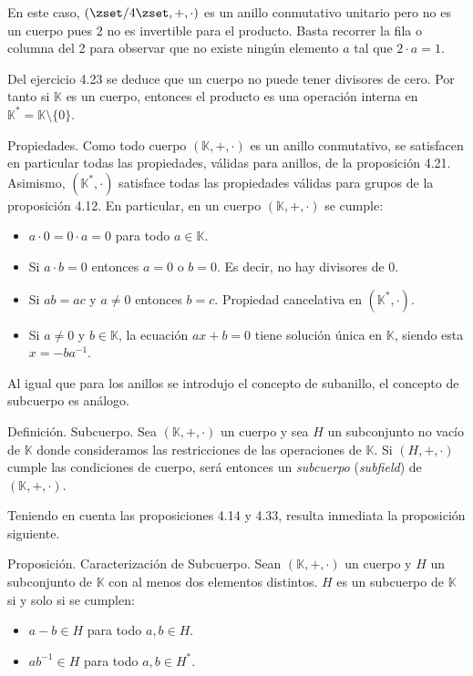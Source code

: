 En este caso, $(\zset/4\zset, +, \cdot)$ es un anillo conmutativo unitario
pero no es un cuerpo  pues 2 no es invertible para el producto. Basta
recorrer la fila o columna del 2 para observar que no existe ningún elemento
$a$ tal que $2 \cdot a = 1$.

Del ejercicio 4.23 se deduce que un cuerpo no puede tener divisores de cero.
Por tanto  si $\mathbb{K}$ es un cuerpo, entonces el producto es una
operación interna en $\mathbb{K}^* = \mathbb{K} \setminus \{0\}$.

Propiedades. Como todo cuerpo $(\mathbb{K}, +, \cdot)$ es un anillo
conmutativo, se satisfacen en particular todas las propiedades, válidas para
anillos, de la proposición 4.21. Asimismo, $(\mathbb{K}^*, \cdot)$ satisface
todas las propiedades válidas para grupos de la proposición 4.12. En
particular, en un cuerpo $(\mathbb{K}, +, \cdot)$ se cumple:

\begin{itemize}
  \item $a \cdot 0 = 0 \cdot a = 0$ para todo $a \in \mathbb{K}$.
  \item Si $a \cdot b = 0$ entonces $a = 0$ o $b = 0$. Es decir, no hay
    divisores de $0$.
  \item Si $ab = ac$ y $a \neq 0$ entonces $b = c$. Propiedad cancelativa en
    $(\mathbb{K}^*, \cdot)$.
  \item Si $a \neq 0$ y $b \in \mathbb{K}$, la ecuación $ax + b = 0$ tiene
    solución única en $\mathbb{K}$, siendo esta $x = -ba^{-1}$.
\end{itemize}

Al igual que para los anillos se introdujo el concepto de subanillo, el
concepto de subcuerpo es análogo.

Definición. Subcuerpo. Sea $(\mathbb{K}, +, \cdot)$ un cuerpo y sea $H$ un
subconjunto no vacío de $\mathbb{K}$ donde consideramos las restricciones de
las operaciones de $\mathbb{K}$. Si $(H, +, \cdot)$ cumple las condiciones
de cuerpo, será entonces un \emph{subcuerpo} (\emph{subfield}) de
$(\mathbb{K}, +, \cdot)$.

Teniendo en cuenta las proposiciones 4.14 y 4.33, resulta inmediata la
proposición siguiente.

Proposición. Caracterización de Subcuerpo. Sean $(\mathbb{K}, +, \cdot)$ un
cuerpo y $H$ un subconjunto de $\mathbb{K}$ con al menos dos elementos
distintos. $H$ es un subcuerpo de $\mathbb{K}$ si y solo si se cumplen:

\begin{itemize}
  \item $a - b \in H$ para todo $a, b \in H$.
  \item $ab^{-1} \in H$ para todo $a, b \in H^*$.
\end{itemize}

























